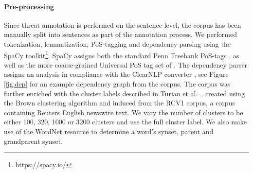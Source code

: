 \documentclass[11pt,letterpaper]{article}
\let\tag=\textsc
\begin{document}
\paragraph{Pre-processing}Since threat annotation is performed on the sentence level, the corpus has been manually split into sentences as part of the annotation process.  We performed tokenization, lemmatization, PoS-tagging and dependency parsing using the SpaCy toolkit\footnote{https://spacy.io/}.  SpaCy assigns both the standard Penn Treebank PoS-tags \cite{Mar:San:Mar:93}, as well as the more coarse-grained Universal PoS tag set of . The dependency parser assigns an analysis in compliance with the ClearNLP converter \cite{Cho:Pal:12}, see Figure \ref{fig:dep} for an example dependency graph from the corpus. The corpus was further enriched with the cluster labels described in Turian et al.~, created using the Brown clustering algorithm \cite{Bro:deS:Mer:92} and induced from the RCV1 corpus, a corpus containing Reuters English newswire text.
We vary the number of clusters to be either 100, 320, 1000 or 3200 clusters and use the full cluster label.  We also make use of the WordNet resource \cite{wordnet} to determine a word's synset, parent and grandparent synset.

\end{document}
